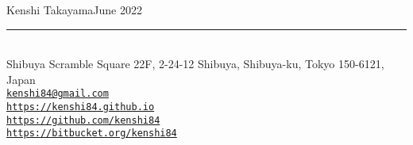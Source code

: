 {\Large\sc Kenshi Takayama}\hfill June 2022
\rule{\textwidth}{1pt}\\
{\small
Shibuya Scramble Square 22F, 2-24-12 Shibuya, Shibuya-ku, Tokyo 150-6121, Japan\\
\href{mailto:kenshi84@gmail.com}{{\tt kenshi84@gmail.com}}\\
\href{https://kenshi84.github.io}{{\tt https://kenshi84.github.io}}\\
\href{https://github.com/kenshi84}{{\tt https://github.com/kenshi84}}\\
\href{https://bitbucket.org/kenshi84}{{\tt https://bitbucket.org/kenshi84}}
}
\vspace{2mm}
